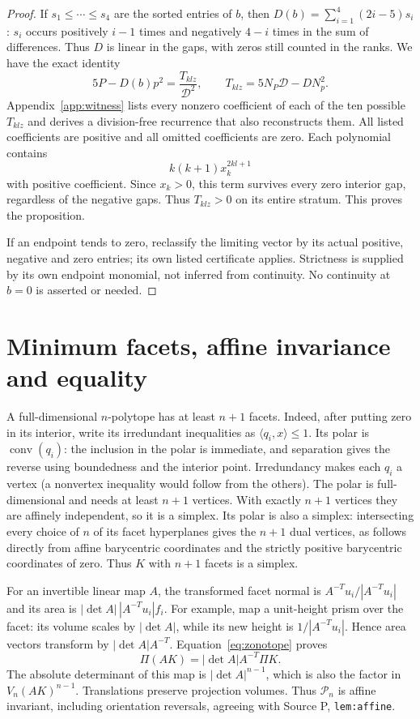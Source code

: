 \documentclass[11pt]{article}
\theoremstyle{remark}\newtheorem{remark}[theorem]{Remark}
\newcommand{\conv}{\operatorname{conv}}
\newcommand{\PP}{\mathcal P}
\newcommand{\Den}{\mathcal D}
\numberwithin{equation}{section}
\begin{document}
\begin{proof}
If $s_1\le\cdots\le s_4$ are the sorted entries of $b$, then
$D(b)=\sum_{i=1}^4(2i-5)s_i$: $s_i$ occurs positively $i-1$ times
and negatively $4-i$ times in the sum of differences. Thus $D$ is
linear in the gaps, with zeros still counted in the ranks. We have the
exact identity
\begin{equation}\label{eq:T}
 5P-D(b)p^2=\frac{T_{klz}}{\Den^2},\qquad
 T_{klz}=5N_P\Den-DN_p^2.
\end{equation}
Appendix~\ref{app:witness} lists every nonzero coefficient of each of
the ten possible $T_{klz}$ and derives a division-free recurrence that
also reconstructs them. All listed coefficients are positive and
all omitted coefficients are zero. Each polynomial contains
\begin{equation}\label{eq:endpoint}
 k(k+1)x_k^{2kl+1}
\end{equation}
with positive coefficient. Since $x_k>0$, this term survives every
zero interior gap, regardless of the negative gaps. Thus $T_{klz}>0$
on its entire stratum. This proves the proposition.

If an endpoint tends to zero, reclassify the limiting vector by its
actual positive, negative and zero entries; its own listed certificate
applies. Strictness is supplied by its own endpoint monomial, not
inferred from continuity. No continuity at $b=0$ is asserted or needed.
\end{proof}

\section{Minimum facets, affine invariance and equality}
A full-dimensional $n$-polytope has at least $n+1$ facets. Indeed, after
putting zero in its interior, write its irredundant inequalities as
$\langle q_i,x\rangle\le1$. Its polar is $\conv(q_i)$: the inclusion
in the polar is immediate, and separation gives the reverse using
boundedness and the interior point. Irredundancy makes each $q_i$ a
vertex (a nonvertex inequality would follow from the others). The polar
is full-dimensional and needs at least $n+1$ vertices. With exactly
$n+1$ vertices they are affinely independent, so it is a simplex.
Its polar is also a simplex: intersecting every choice of $n$ of its
facet hyperplanes gives the $n+1$ dual vertices, as follows directly
from affine barycentric coordinates and the strictly positive
barycentric coordinates of zero. Thus $K$ with $n+1$ facets is a simplex.

For an invertible linear map $A$, the transformed facet normal is
$A^{-T}u_i/|A^{-T}u_i|$ and its area is
$|\det A|\,|A^{-T}u_i|f_i$. For example, map a unit-height prism over
the facet: its volume scales by $|\det A|$, while its new height is
$1/|A^{-T}u_i|$. Hence area vectors transform by $|\det A|A^{-T}$.
Equation~\eqref{eq:zonotope} proves
\[
 \Pi(AK)=|\det A|A^{-T}\Pi K.
\]
The absolute determinant of this map is $|\det A|^{n-1}$, which is
also the factor in $V_n(AK)^{n-1}$. Translations preserve projection
volumes. Thus $\PP_n$ is affine invariant, including orientation
reversals, agreeing with Source P, \texttt{lem:affine}.
\end{document}
